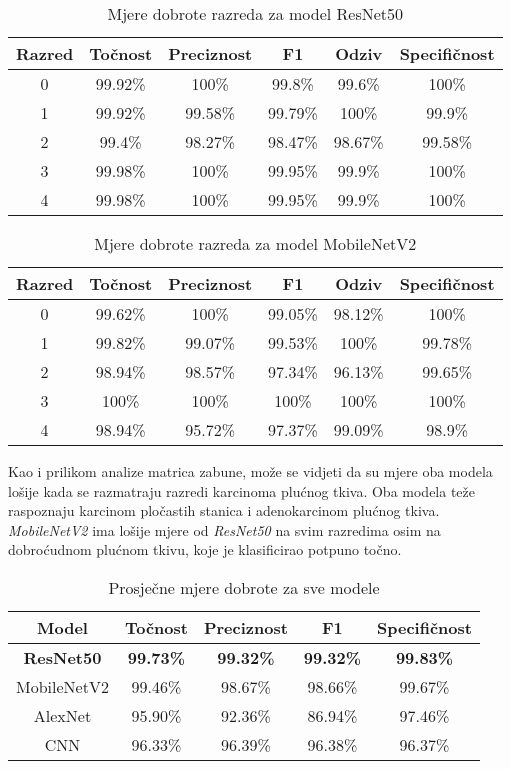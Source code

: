 \documentclass[conference, utf8]{IEEEtran}
\begin{document}
	\begin{table}[H]
		\centering
		\caption{Mjere dobrote razreda za model ResNet50}
		\label{table:4}
		\begin{tabular}{ |c|c|c|c|c|c| } 
			\hline
			Razred & Točnost & Preciznost & F1 & Odziv & Specifičnost \\
			\hline\hline
			0 & 99.92\% & 100\% & 99.8\% & 99.6\% & 100\% \\
			\hline
			1 & 99.92\% & 99.58\% & 99.79\% & 100\% & 99.9\% \\
			\hline
			2 & 99.4\% & 98.27\% & 98.47\% & 98.67\% & 99.58\% \\
			\hline
			3 & 99.98\% & 100\% & 99.95\% & 99.9\% & 100\% \\
			\hline
			4 & 99.98\% & 100\% & 99.95\% & 99.9\% & 100\% \\
			\hline
		\end{tabular}
	\end{table}
	\begin{table}[H]
		\centering
		\caption{Mjere dobrote razreda za model MobileNetV2}
		\label{table:5}
		\begin{tabular}{ |c|c|c|c|c|c| } 
			\hline
			Razred & Točnost & Preciznost & F1 & Odziv & Specifičnost \\
			\hline\hline
			0 & 99.62\% & 100\% & 99.05\% & 98.12\% & 100\% \\
			\hline
			1 & 99.82\% & 99.07\% & 99.53\% & 100\% & 99.78\% \\
			\hline
			2 & 98.94\% & 98.57\% & 97.34\% & 96.13\% & 99.65\% \\
			\hline
			3 & 100\% & 100\% & 100\% & 100\% & 100\% \\
			\hline
			4 & 98.94\% & 95.72\% & 97.37\% & 99.09\% & 98.9\% \\
			\hline
		\end{tabular}
	\end{table}
	
	Kao i prilikom analize matrica zabune, može se vidjeti da su mjere oba modela lošije kada se razmatraju razredi karcinoma plućnog tkiva. Oba modela teže raspoznaju karcinom pločastih stanica i adenokarcinom plućnog tkiva. \textit{MobileNetV2} ima lošije mjere od \textit{ResNet50} na svim razredima osim na dobroćudnom plućnom tkivu, koje je klasificirao potpuno točno. 
	
	
	\begin{table}[H]
		\centering
		\caption{Prosječne mjere dobrote za sve modele}
		\label{table:6}
		\begin{tabular}{ |c|c|c|c|c| } 
			\hline
			Model & Točnost & Preciznost & F1 &   Specifičnost \\
			\hline\hline
			\textbf{ResNet50} & \textbf{99.73\%} & \textbf{99.32\% }& \textbf{99.32\%} &  \textbf{99.83\%} \\
			\hline
			MobileNetV2 & 99.46\% & 98.67\% & 98.66\% &  99.67\% \\
			\hline
			AlexNet\cite{RAD1} & 95.90\% &	92.36\%	&86.94\% &	97.46\%
			\\
			\hline
			CNN\cite{RAD2} & 96.33\% & 96.39\% & 96.38\% & 96.37\% \\
			\hline
		\end{tabular}
	\end{table}
	
\end{document}
